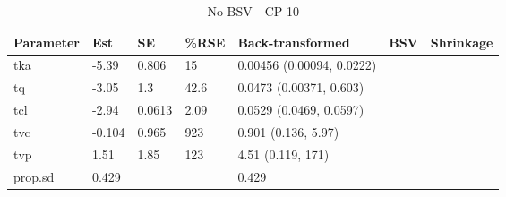 \begin{table}
\centering\centering
\caption{No BSV - CP 10}
\centering
\fontsize{8}{10}\selectfont
\begin{tabular}[t]{lllllll}
\toprule
\textbf{Parameter} & \textbf{Est} & \textbf{SE} & \textbf{\%RSE} & \textbf{Back-transformed} & \textbf{BSV} & \textbf{Shrinkage}\\
\midrule
tka & -5.39 & 0.806 & 15 & 0.00456 (0.00094, 0.0222) &  & \\
\midrule
tq & -3.05 & 1.3 & 42.6 & 0.0473 (0.00371, 0.603) &  & \\
\midrule
tcl & -2.94 & 0.0613 & 2.09 & 0.0529 (0.0469, 0.0597) &  & \\
\midrule
tvc & -0.104 & 0.965 & 923 & 0.901 (0.136, 5.97) &  & \\
\midrule
tvp & 1.51 & 1.85 & 123 & 4.51 (0.119, 171) &  & \\
\midrule
prop.sd & 0.429 &  &  & 0.429 &  & \\
\bottomrule
\end{tabular}
\end{table}